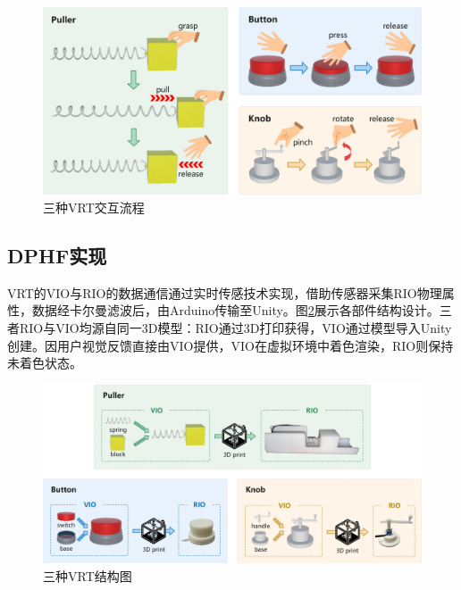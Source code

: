 \documentclass[runningheads]{llncs}
\begin{document}
\begin{figure}[t]
  \centering
  \includegraphics[width=1\textwidth]{image/Interaction-Flow.pdf}
  \caption{三种VRT交互流程}
  \label{fig:interaction-flow}
\end{figure}

\subsection{DPHF实现}
VRT的VIO与RIO的数据通信通过实时传感技术实现，借助传感器采集RIO物理属性，数据经卡尔曼滤波后，由Arduino传输至Unity。图\ref{fig:structural-diagram}展示各部件结构设计。三者RIO与VIO均源自同一3D模型：RIO通过3D打印获得，VIO通过模型导入Unity创建。因用户视觉反馈直接由VIO提供，VIO在虚拟环境中着色渲染，RIO则保持未着色状态。

\begin{figure}[t]
  \centering
  \includegraphics[width=1\textwidth]{image/Structural-Diagram.pdf}
  \caption{三种VRT结构图}
  \label{fig:structural-diagram}
\end{figure}
\end{document}
